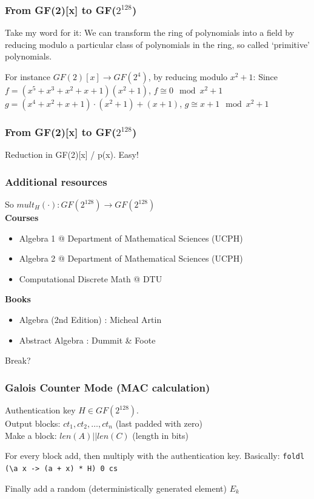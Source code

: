 \documentclass{beamer}
\begin{document}
\begin{frame}
\frametitle{From GF(2)[x] to GF($2^{128}$)}

Take my word for it:
We can transform the ring of polynomials into a field by reducing
modulo a particular class of polynomials in the ring, so called `primitive' polynomials.

\vspace{3mm}

For instance $GF(2)[x] \to GF(2^{4})$, by reducing modulo $x^{2} + 1$:
Since $ f = (x^{5} + x^{3} + x^{2} + x + 1) (x^{2} + 1)$, $f \cong 0 \mod x^{2} + 1$
$ g = (x^{4} + x^{2} + x + 1) \cdot (x^{2} + 1) + (x + 1)$, $g \cong x + 1 \mod x^{2} + 1$

\end{frame}

\begin{frame}
\frametitle{From GF(2)[x] to GF($2^{128}$)}
Reduction in GF(2)[x] / p(x). Easy!
\end{frame}

\begin{frame}
\frametitle{Additional resources}
So $mult_{H}(\cdot) : GF(2^{128}) \to GF(2^{128})$ \\
\vspace{3mm}
\textbf{Courses}
\begin{itemize}
    \item Algebra 1 @ Department of Mathematical Sciences (UCPH)
    \item Algebra 2 @ Department of Mathematical Sciences (UCPH)
    \item Computational Discrete Math @ DTU
\end{itemize}
\textbf{Books}
\begin{itemize}
    \item Algebra (2nd Edition) : Micheal Artin
    \item Abstract Algebra : Dummit \& Foote
\end{itemize}
Break?
\end{frame}

\begin{frame}
\frametitle{Galois Counter Mode (MAC calculation)}
Authentication key $H \in GF(2^{128})$. \\
Output blocks: $ct_{1}, ct_{2}, \ldots, ct_{n}$ (last padded with zero) \\
Make a block: $len(A) || len(C)$ (length in bits) \\

\vspace{3mm}

For every block add, then multiply with the authentication key.
Basically:
\texttt{foldl (\textbackslash a x -> (a + x) * H) 0 cs}

\vspace{3mm}

Finally add a random (deterministically generated element) $E_{k}$
\end{frame}
\end{document}
